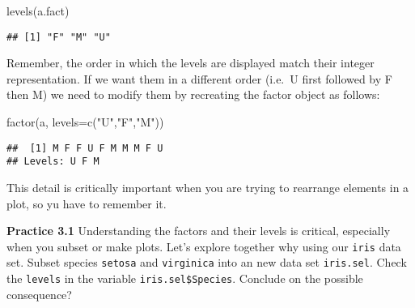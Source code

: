 \documentclass[
]{article}
\newenvironment{Shaded}{\begin{snugshade}}{\end{snugshade}}
\newcommand{\AttributeTok}[1]{\textcolor[rgb]{0.77,0.63,0.00}{#1}}
\newcommand{\CommentTok}[1]{\textcolor[rgb]{0.56,0.35,0.01}{\textit{#1}}}
\newcommand{\FunctionTok}[1]{\textcolor[rgb]{0.00,0.00,0.00}{#1}}
\newcommand{\NormalTok}[1]{#1}
\newcommand{\OtherTok}[1]{\textcolor[rgb]{0.56,0.35,0.01}{#1}}
\newcommand{\SpecialCharTok}[1]{\textcolor[rgb]{0.00,0.00,0.00}{#1}}
\newcommand{\StringTok}[1]{\textcolor[rgb]{0.31,0.60,0.02}{#1}}
\begin{document}
\begin{Shaded}
\begin{Highlighting}[]
\FunctionTok{levels}\NormalTok{(a.fact)}
\end{Highlighting}
\end{Shaded}

\begin{verbatim}
## [1] "F" "M" "U"
\end{verbatim}

Remember, the order in which the levels are displayed match their
integer representation. If we want them in a different order (i.e.~U
first followed by F then M) we need to modify them by recreating the
factor object as follows:

\begin{Shaded}
\begin{Highlighting}[]
\FunctionTok{factor}\NormalTok{(a, }\AttributeTok{levels=}\FunctionTok{c}\NormalTok{(}\StringTok{"U"}\NormalTok{,}\StringTok{"F"}\NormalTok{,}\StringTok{"M"}\NormalTok{))}
\end{Highlighting}
\end{Shaded}

\begin{verbatim}
##  [1] M F F U F M M M F U
## Levels: U F M
\end{verbatim}

This detail is critically important when you are trying to rearrange
elements in a plot, so yu have to remember it.

\textbf{Practice 3.1} Understanding the factors and their levels is
critical, especially when you subset or make plots. Let's explore
together why using our \texttt{iris} data set. Subset species
\texttt{setosa} and \texttt{virginica} into an new data set
\texttt{iris.sel}. Check the \texttt{levels} in the variable
\texttt{iris.sel\$Species}. Conclude on the possible consequence?

\begin{Shaded}
\end{Shaded}
\end{document}
